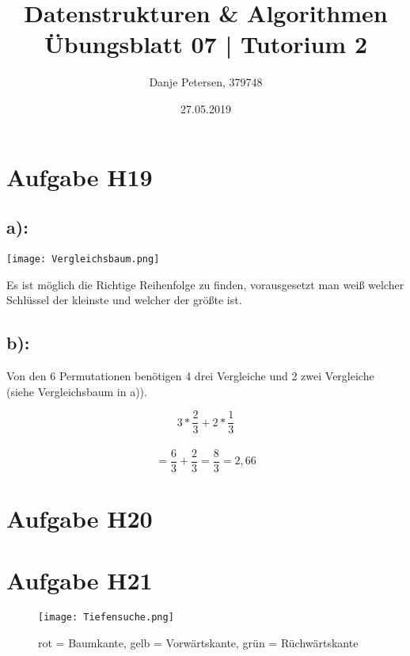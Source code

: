 \documentclass[a4paper,graphics,14pt]{article}
\author		{ \Large Danje Petersen, 379748}
\title{ \Huge Datenstrukturen \& Algorithmen \\
		\huge Übungsblatt 07 | Tutorium 2}
\date{27.05.2019}
\newcommand{\aufgabe}[1]{\section*{Aufgabe #1}}
\newcommand{\apt}[1]{\subsection*{#1:} }
\begin{document}
\doublespacing
\maketitle
\onehalfspacing

\aufgabe{H19}

\apt{a)}

\texttt{[image: Vergleichsbaum.png]}

Es ist möglich die Richtige Reihenfolge zu finden, vorausgesetzt man weiß welcher Schlüssel der kleinste und welcher der größte ist.

\newpage

\apt{b)}
Von den 6 Permutationen benötigen 4 drei Vergleiche und 2 zwei Vergleiche (siehe Vergleichsbaum in a)).
\begin{center}
\[ 3 * \frac{2}{3} + 2 * \frac{1}{3} \] \\ 
\[ = \frac{6}{3} + \frac{2}{3} = \frac{8}{3} = 2,66 \]
\end{center}


\aufgabe{H20}



\aufgabe{H21}

\begin{figure}[h]
\texttt{[image: Tiefensuche.png]}
\caption{rot = Baumkante, gelb = Vorwärtskante, grün = Rüchwärtskante}
\end{figure}
\end{document}
